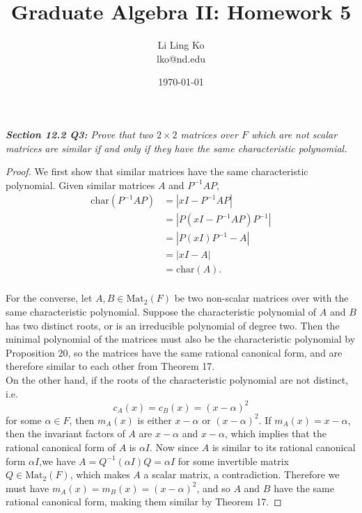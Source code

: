 \documentclass{article}
\begin{document}
\title{Graduate Algebra II: Homework 5}
\author{Li Ling Ko\\ lko@nd.edu}
\date{\today}
\maketitle

\it \textbf{Section 12.2 Q3:} Prove that two $2\times2$ matrices over $F$
  which are not scalar matrices are similar if and only if they have the
  same characteristic polynomial.

  \begin{proof}
    We first show that similar matrices have the same characteristic
    polynomial. Given similar matrices $A$ and $P^{-1}AP$,
    \begin{align*}
      \text{char}(P^{-1}AP) &=|xI-P^{-1}AP|\\
      &=|P(xI-P^{-1}AP)P^{-1}|\\
      &=|P(xI)P^{-1}-A|\\
      &=|xI-A|\\
      &=\text{char}(A).\\
    \end{align*}

    For the converse, let $A,B\in\text{Mat}_2(F)$ be two non-scalar
    matrices over with the same characteristic polynomial. Suppose the
    characteristic polynomial of $A$ and $B$ has two distinct roots, or is
    an irreducible polynomial of degree two. Then the minimal polynomial of
    the matrices must also be the characteristic polynomial by Proposition
    20, so the matrices have the same rational canonical form, and
    are therefore similar to each other from Theorem 17. \\

    On the other hand, if the roots of the characteristic polynomial are
    not distinct, i.e.
    \[c_A(x)=c_B(x)=(x-\alpha)^2\]
    for some $\alpha\in F$, then $m_A(x)$ is either $x-\alpha$ or
    $(x-\alpha)^2$. If $m_A(x)=x-\alpha$, then the invariant factors of $A$
    are $x-\alpha$ and $x-\alpha$, which implies that the rational
    canonical form of $A$ is $\alpha I$. Now since $A$ is similar to its
    rational canonical form $\alpha I$,we have $A=Q^{-1}(\alpha I)Q=\alpha
    I$ for some invertible matrix $Q\in\text{Mat}_2(F)$, which makes $A$ a
    scalar matrix, a contradiction. Therefore we must have
    $m_A(x)=m_B(x)=(x-\alpha)^2$, and so $A$ and $B$ have the same rational
    canonical form, making them similar by Theorem 17.
  \end{proof}
\end{document}
